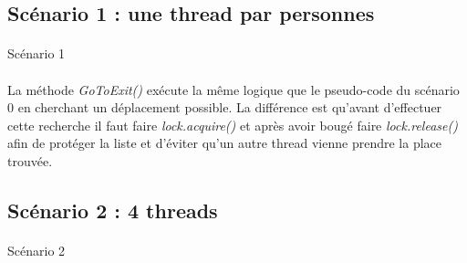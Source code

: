 \documentclass[12pt,oneside,a4paper]{article}
\makeatletter
\def\BState{\State\hskip-\ALG@thistlm}
\makeatother
\begin{document}
\subsection{Scénario 1 : une thread par personnes}
\paragraph{}

\begin{algorithm}[H]
  \caption{Scénario 1}\label{euclid}
\end{algorithm}

\paragraph{}
La méthode \textit{GoToExit()} exécute la même logique que le pseudo-code du scénario 0 en
cherchant un déplacement possible. La différence est qu'avant d'effectuer cette recherche il faut faire
\textit{lock.acquire()} et après avoir bougé faire \textit{lock.release()} afin de protéger
la liste et d'éviter qu'un autre thread vienne prendre la place trouvée.

\subsection{Scénario 2 : 4 threads}
\paragraph{}

\begin{algorithm}[H]
  \caption{Scénario 2}\label{euclid}
\end{algorithm}
\end{document}
